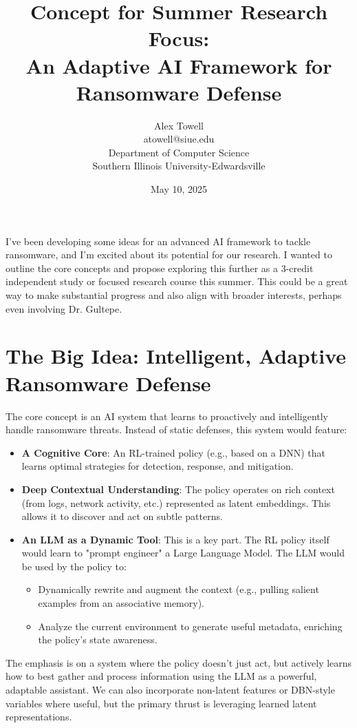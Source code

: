 \documentclass[11pt]{article}
\title{\textbf{Concept for Summer Research Focus: \\ An Adaptive AI Framework for Ransomware Defense}}
\author{
    Alex Towell \\
    atowell@siue.edu \\
    Department of Computer Science \\
    Southern Illinois University-Edwardsville \\
}
\date{May 10, 2025}
\begin{document}
\maketitle

I've been developing some ideas for an advanced AI framework to tackle ransomware, and I'm excited about its potential for our research. I wanted to outline the core concepts and propose exploring this further as a 3-credit independent study or focused research course this summer. This could be a great way to make substantial progress and also align with broader interests, perhaps even involving Dr. Gultepe.

\section*{The Big Idea: Intelligent, Adaptive Ransomware Defense}

The core concept is an AI system that learns to proactively and intelligently handle ransomware threats. Instead of static defenses, this system would feature:

\begin{itemize}
    \item \textbf{A Cognitive Core}: An RL-trained policy (e.g., based on a DNN) that learns optimal strategies for detection, response, and mitigation.
    \item \textbf{Deep Contextual Understanding}: The policy operates on rich context (from logs, network activity, etc.) represented as latent embeddings. This allows it to discover and act on subtle patterns.
    \item \textbf{An LLM as a Dynamic Tool}: This is a key part. The RL policy itself would learn to "prompt engineer" a Large Language Model. The LLM would be used by the policy to:
        \begin{itemize}
            \item Dynamically rewrite and augment the context (e.g., pulling salient examples from an associative memory).
            \item Analyze the current environment to generate useful metadata, enriching the policy's state awareness.
        \end{itemize}
\end{itemize}

The emphasis is on a system where the policy doesn't just act, but actively learns how to best gather and process information using the LLM as a powerful, adaptable assistant. We can also incorporate non-latent features or DBN-style variables where useful, but the primary thrust is leveraging learned latent representations.
\end{document}
